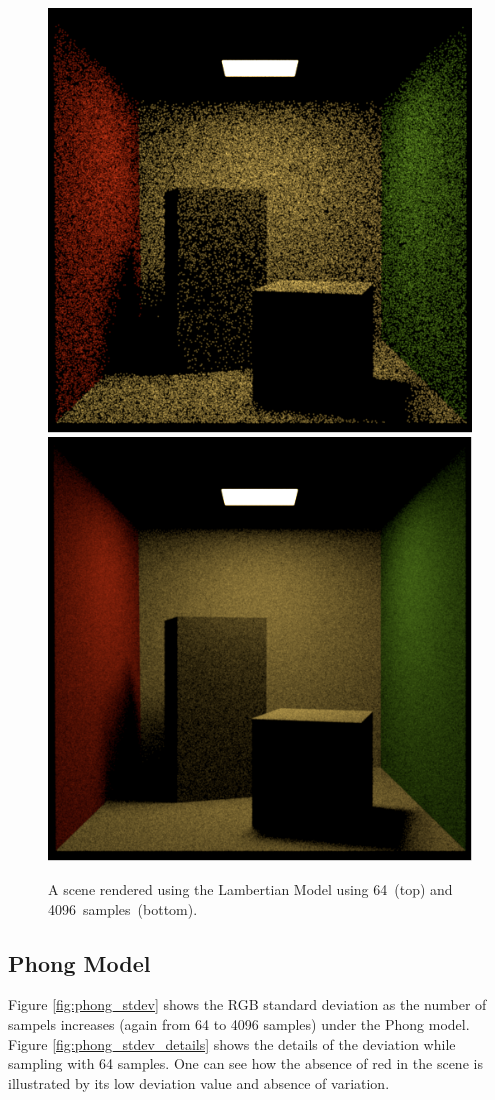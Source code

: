 \documentclass{article}
\begin{document}
\begin{figure}[p]
\centering
\includegraphics[width=.75\textwidth]{assets/lamb64}
\\
\includegraphics[width=.75\textwidth]{assets/lamb1024}

\caption{A scene rendered using the Lambertian Model using 64~(top) and 4096~samples~(bottom).}
\label{fig:lamb_rendering}
\end{figure}

\subsection*{Phong Model}
Figure \ref{fig:phong_stdev} shows the RGB standard deviation as the number of sampels increases (again from 64 to 4096 samples) under the Phong model. Figure \ref{fig:phong_stdev_details} shows the details of the deviation while sampling with 64 samples. One can see how the absence of red in the scene is illustrated by its low deviation value and absence of variation.
\end{document}
